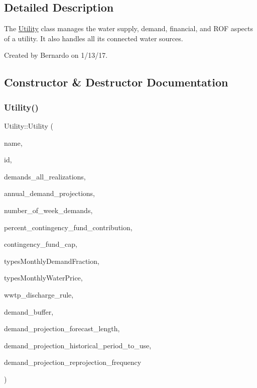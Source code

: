\subsection{Detailed Description}
The {\ttfamily \mbox{\hyperlink{classUtility}{Utility}}} class manages the water supply, demand, financial, and R\+OF aspects of a utility. It also handles all its connected water sources. 

Created by Bernardo on 1/13/17. 

\subsection{Constructor \& Destructor Documentation}
\mbox{\label{classUtility_a53fb19e5a344de5892c5cfbcc1225da9}} 
\subsubsection{\texorpdfstring{Utility()}{Utility()}\hspace{0.1cm}{\footnotesize\ttfamily [1/4]}}
{\footnotesize\ttfamily Utility\+::\+Utility (\begin{DoxyParamCaption}\item[{const char $\ast$}]{name,  }\item[{int}]{id,  }\item[{vector$<$ vector$<$ double $>$$>$ \&}]{demands\+\_\+all\+\_\+realizations,  }\item[{vector$<$ double $>$ \&}]{annual\+\_\+demand\+\_\+projections,  }\item[{int}]{number\+\_\+of\+\_\+week\+\_\+demands,  }\item[{const double}]{percent\+\_\+contingency\+\_\+fund\+\_\+contribution,  }\item[{const double}]{contingency\+\_\+fund\+\_\+cap,  }\item[{const vector$<$ vector$<$ double $>$$>$ \&}]{types\+Monthly\+Demand\+Fraction,  }\item[{const vector$<$ vector$<$ double $>$$>$ \&}]{types\+Monthly\+Water\+Price,  }\item[{\mbox{\hyperlink{classWwtpDischargeRule}{Wwtp\+Discharge\+Rule}}}]{wwtp\+\_\+discharge\+\_\+rule,  }\item[{double}]{demand\+\_\+buffer,  }\item[{int}]{demand\+\_\+projection\+\_\+forecast\+\_\+length,  }\item[{int}]{demand\+\_\+projection\+\_\+historical\+\_\+period\+\_\+to\+\_\+use,  }\item[{int}]{demand\+\_\+projection\+\_\+reprojection\+\_\+frequency }\end{DoxyParamCaption})}



